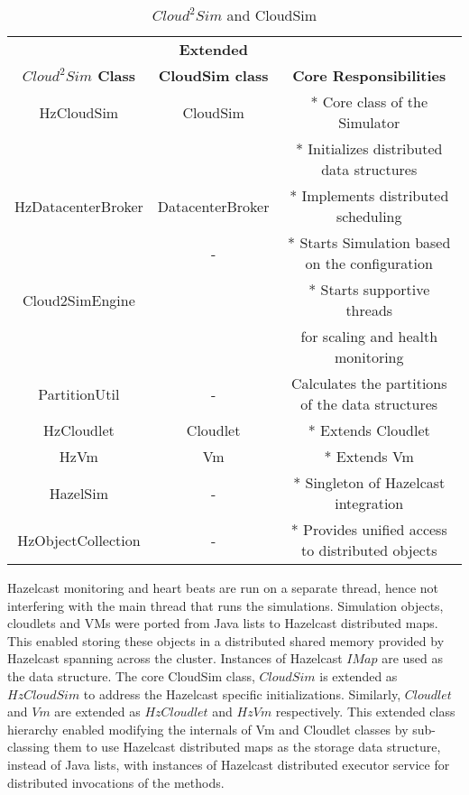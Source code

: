 \begin{table}[!t]
\caption{$Cloud^{2}Sim$ and CloudSim}
\label{table:inheritance}
\begin{tabular}{|c||c| |c|}
\hline
 & \textbf{Extended} & \\
\textbf{$Cloud^{2}Sim$ Class} &\textbf{CloudSim class} & \textbf{Core Responsibilities}\\
\hline
HzCloudSim & CloudSim & * Core class of the Simulator\\
& & * Initializes distributed data structures \\
\hline
HzDatacenterBroker & DatacenterBroker & * Implements distributed scheduling\\
\hline
 & - & * Starts Simulation based on the configuration \\
Cloud2SimEngine & & * Starts supportive threads \\
& & for scaling and health monitoring\\
\hline
PartitionUtil & - & Calculates the partitions of the data structures\\
\hline
HzCloudlet & Cloudlet & * Extends Cloudlet\\
\hline
HzVm & Vm & * Extends Vm\\
\hline
HazelSim & - & * Singleton of Hazelcast integration\\
\hline
HzObjectCollection & - & * Provides unified access to distributed objects\\
\hline
\end{tabular}
\end{table}

Hazelcast monitoring and heart beats are run on a separate thread, hence not interfering with the main thread that runs the simulations. Simulation objects, cloudlets and VMs were ported from Java lists to Hazelcast distributed maps. This enabled storing these objects in a distributed shared memory provided by Hazelcast spanning across the cluster. Instances of Hazelcast $IMap$ are used as the data structure. The core CloudSim class, $CloudSim$ is extended as $HzCloudSim$ to address the Hazelcast specific initializations. Similarly, $Cloudlet$ and $Vm$ are extended as $HzCloudlet$ and $HzVm$ respectively. This extended class hierarchy enabled modifying the internals of Vm and Cloudlet classes by sub-classing them to use Hazelcast distributed maps as the storage data structure, instead of Java lists, with instances of Hazelcast distributed executor service for distributed invocations of the methods. 

